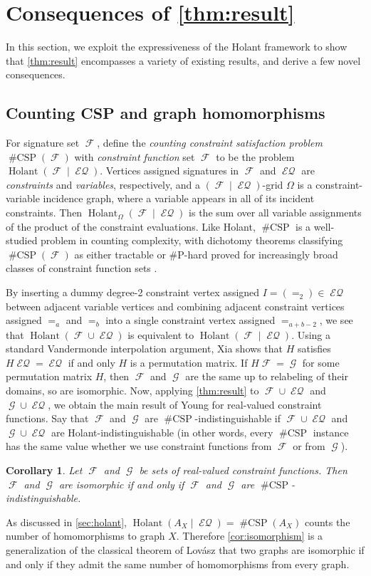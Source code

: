 \documentclass{article}
\newtheorem{corollary}{Corollary}[section]
\theoremstyle{remark}
\theoremstyle{definition}
\DeclareMathOperator{\fc}{\mathcal{F}}
\DeclareMathOperator{\gc}{\mathcal{G}}
\DeclareMathOperator{\holant}{Holant}
\DeclareMathOperator{\csp}{\#CSP}
\DeclareMathOperator{\eq}{\mathcal{EQ}}
\begin{document}
 \section{Consequences of \autoref{thm:result}}
\label{sec:corollaries}
In this section, we exploit the expressiveness of the Holant framework to show that \autoref{thm:result}
encompasses a variety of existing results, and derive a few novel consequences.
\subsection{Counting CSP and graph homomorphisms}
For signature set $\fc$, define the \emph{counting constraint satisfaction problem} $\csp(\fc)$
with \emph{constraint function} set $\fc$
to be the problem $\holant(\fc \mid \eq)$. Vertices assigned signatures in $\fc$ and $\eq$ are 
\emph{constraints} and \emph{variables}, respectively, and a $(\fc\mid\eq)$-grid $\Omega$ is a 
constraint-variable incidence graph, where a variable appears in all of its incident constraints. Then
$\holant_\Omega(\fc\mid\eq)$ is the sum over all variable assignments of the product of the constraint
evaluations.
Like Holant, $\csp$ is a well-studied
problem in counting complexity, with dichotomy theorems classifying $\csp(\fc)$ as either tractable
or \#P-hard proved for increasingly broad classes of constraint function sets 
\cite{bulatov_2013, dyer_richerby, cai-chen-lu, cai-chen-complexity}. 

By inserting a dummy degree-2 constraint vertex assigned $I = (=_2) \in \eq$ between adjacent variable vertices and combining adjacent constraint
vertices assigned $=_a$ and $=_b$ into a single constraint vertex assigned $=_{a+b-2}$, we see that
$\holant(\fc \cup \eq)$ is equivalent to $\holant(\fc \mid \eq)$. Using a standard Vandermonde
interpolation argument, Xia \cite{xia} shows that $H$ satisfies $H \eq = \eq$ if and only
$H$ is a permutation matrix. If $H\fc = \gc$ for some permutation matrix $H$, then $\fc$ and $\gc$
are the same up to relabeling of their domains, so are isomorphic. 
Now, applying \autoref{thm:result} to $\fc \cup \eq$ and $\gc \cup
\eq$, we obtain the main result of Young \cite{young2022equality} for real-valued constraint functions.
Say that $\fc$ and $\gc$ are $\csp$-indistinguishable if $\fc\cup\eq$ and $\gc\cup\eq$ are 
Holant-indistinguishable (in other words, every $\csp$ instance has the same value whether we use 
constraint functions from $\fc$ or from $\gc$).
\begin{corollary}
    Let $\fc$ and $\gc$ be sets of real-valued constraint functions.
    Then $\fc$ and $\gc$ are isomorphic if and only if $\fc$ and $\gc$ are $\csp$-indistinguishable.
    \label{cor:isomorphism}
\end{corollary}
As discussed in \autoref{sec:holant}, 
$\holant(A_X \mid \eq) = \csp(A_X)$ counts the number of homomorphisms to graph $X$. Therefore
\autoref{cor:isomorphism} is a generalization of the classical theorem of Lovász \cite{lovasz_operations}
that two graphs are isomorphic if and only if they admit the same number of homomorphisms from every
graph.
\end{document}
